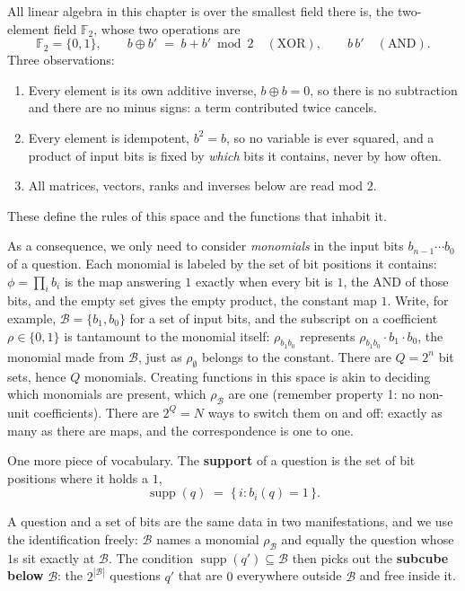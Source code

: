\documentclass[11pt]{article}
\begin{document}
All linear algebra in this chapter is over the smallest field there
is, the two-element field $\mathbb F_2$, whose two operations are
%
\begin{equation}
  \mathbb F_2 = \{0, 1\},
  \qquad
  b \oplus b' \;=\; b + b' \bmod 2 \quad (\text{XOR}),
  \qquad
  b \, b' \quad (\text{AND}).
  \label{eq:f2}
\end{equation}
%
Three observations:
\begin{enumerate}
  \item Every element is its own additive
inverse, $b \oplus b = 0$, so there is no subtraction and there are no
minus signs: a term contributed twice cancels.
\item Every element is
idempotent, $b^2 = b$, so no variable is ever squared, and a product
of input bits is fixed by \emph{which} bits it contains, never by how
often. 
\item All matrices, vectors, ranks and inverses below are read mod
$2$.
\end{enumerate} 
These define the rules of this space and the functions that inhabit it.

As a consequence, we only need to consider \emph{monomials} in the input bits $b_{n-1} \cdots b_0$ of a question.
Each monomial is labeled by the set of bit positions it
contains: $\phi = \prod_i b_i$ is the map answering $1$
exactly when every bit is $1$, the AND of those bits,
and the empty set gives the empty product, the constant map $1$. Write, for example,
$\mathcal B = \{b_1, b_0\}$ for a set of input bits, and the subscript
on a coefficient $\rho\in \{0,1\}$ is tantamount to the monomial itself: $\rho_{b_1 b_0}$ represents $\rho_{b_1 b_0}\cdot b_1\cdot b_0$, the monomial made from
$\mathcal B$, just as $\rho_\emptyset$ belongs to the constant. There
are $Q = 2^n$ bit sets, hence $Q$ monomials. Creating functions in this space is akin
to deciding which monomials are present, which $\rho_{\mathcal B}$ are one (remember property 1: no non-unit coefficients).
There are $2^Q = N$ ways to
switch them on and off: exactly as many as there are maps, and the
correspondence is one to one. 

One more piece of vocabulary. The \textbf{support} of a question is the
set of bit positions where it holds a $1$,
%
\begin{equation}
  \operatorname{supp}(q) \;=\; \{\, i : b_i(q) = 1 \,\}.
  \label{eq:supp}
\end{equation}
%

A question and a set of bits are the same data in two manifestations,
and we use the identification freely: $\mathcal B$ names a monomial $\rho_{\mathcal{B}}$
and equally the question whose $1$s sit exactly at $\mathcal B$. The
condition $\operatorname{supp}(q') \subseteq \mathcal B$ then picks out
the \textbf{subcube below} $\mathcal B$: the $2^{|\mathcal B|}$
questions $q'$ that are $0$ everywhere outside $\mathcal B$ and free inside
it.
\end{document}
